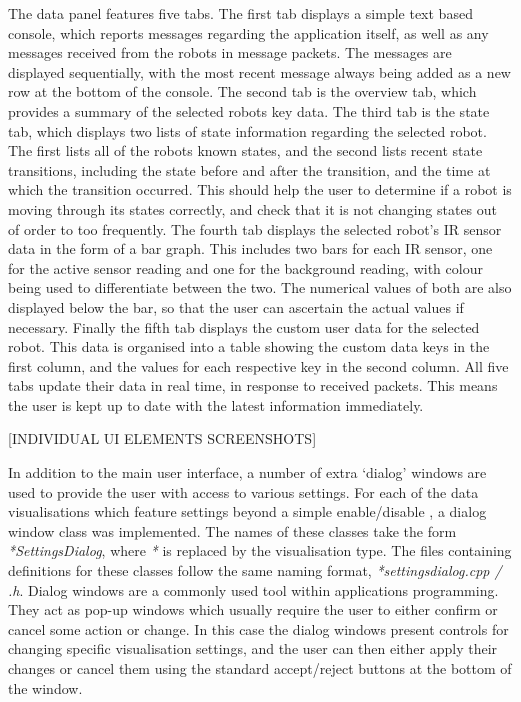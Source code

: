 The data panel features five tabs. The first tab displays a simple text based console, which reports messages regarding the application itself, as well as any messages received from the robots in message packets. The messages are displayed sequentially, with the most recent message always being added as a new row at the bottom of the console. The second tab is the overview tab, which provides a summary of the selected robots key data. The third tab is the state tab, which displays two lists of state information regarding the selected robot. The first lists all of the robots known states, and the second lists recent state transitions, including the state before and after the transition, and the time at which the transition occurred. This should help the user to determine if a robot is moving through its states correctly, and check that it is not changing states out of order to too frequently. The fourth tab displays the selected robot's IR sensor data in the form of a bar graph. This includes two bars for each IR sensor, one for the active sensor reading and one for the background reading, with colour being used to differentiate between the two. The numerical values of both are also displayed below the bar, so that the user can ascertain the actual values if necessary. Finally the fifth tab displays the custom user data for the selected robot. This data is organised into a table showing the custom data keys in the first column, and the values for each respective key in the second column. All five tabs update their data in real time, in response to received packets. This means the user is kept up to date with the latest information immediately.

[INDIVIDUAL UI ELEMENTS SCREENSHOTS]

In addition to the main user interface, a number of extra `dialog' windows are used to provide the user with access to various settings. For each of the data visualisations which feature settings beyond a simple enable/disable , a dialog window class was implemented. The names of these classes take the form \textit{*SettingsDialog}, where \textit{*} is replaced by the visualisation type. The files containing definitions for these classes follow the same naming format, \textit{*settingsdialog.cpp / .h}. Dialog windows are a commonly used tool within applications programming. They act as pop-up windows which usually require the user to either confirm or cancel some action or change. In this case the dialog windows present controls for changing specific visualisation settings, and the user can then either apply their changes or cancel them using the standard accept/reject buttons at the bottom of the window.

